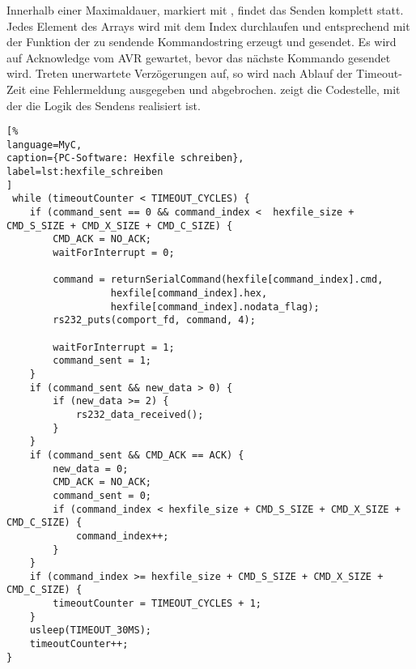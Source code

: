 Innerhalb einer Maximaldauer, markiert mit , findet das Senden komplett statt. Jedes Element des Arrays  wird mit dem Index  durchlaufen und entsprechend mit der Funktion  der zu sendende Kommandostring erzeugt und gesendet. Es wird auf Acknowledge vom AVR gewartet, bevor das nächste Kommando gesendet wird. Treten unerwartete Verzögerungen auf, so wird nach Ablauf der Timeout-Zeit eine Fehlermeldung ausgegeben und abgebrochen.  zeigt die Codestelle, mit der die Logik des Sendens realisiert ist. 
\begin{lstlisting}[%
language=MyC,
caption={PC-Software: Hexfile schreiben},
label=lst:hexfile_schreiben
]
 while (timeoutCounter < TIMEOUT_CYCLES) {
    if (command_sent == 0 && command_index <  hexfile_size + CMD_S_SIZE + CMD_X_SIZE + CMD_C_SIZE) {
        CMD_ACK = NO_ACK;
        waitForInterrupt = 0;

        command = returnSerialCommand(hexfile[command_index].cmd,
                  hexfile[command_index].hex,
                  hexfile[command_index].nodata_flag);
        rs232_puts(comport_fd, command, 4);

        waitForInterrupt = 1;
        command_sent = 1;
    }
    if (command_sent && new_data > 0) {
        if (new_data >= 2) {
            rs232_data_received();
        }
    }
    if (command_sent && CMD_ACK == ACK) {
        new_data = 0;
        CMD_ACK = NO_ACK;
        command_sent = 0;
        if (command_index < hexfile_size + CMD_S_SIZE + CMD_X_SIZE + CMD_C_SIZE) {
            command_index++;
        }
    }
    if (command_index >= hexfile_size + CMD_S_SIZE + CMD_X_SIZE + CMD_C_SIZE) {
        timeoutCounter = TIMEOUT_CYCLES + 1;
    }
    usleep(TIMEOUT_30MS);
    timeoutCounter++;
}
\end{lstlisting}%
